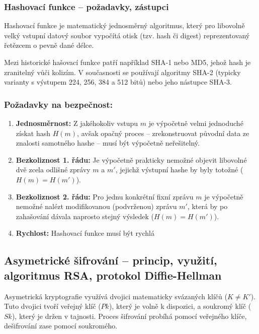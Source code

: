                 \subsubsection{Hashovací funkce – požadavky, zástupci}
                    Hashovací funkce je matematický jednosměrný algoritmus, který pro libovolně velký vstupní datový soubor vypočítá otisk (tzv. hash či digest) reprezentovaný řetězcem o pevně dané délce.

                    Mezi historické hašovací funkce patří například SHA-1 nebo MD5, jehož hash je zranitelný vůči kolizím. V současnosti se používají algoritmy SHA-2 (typicky varianty s výstupem 224, 256, 384 a 512 bitů) nebo jeho nástupce SHA-3.

                    
                    \subsubsection*{Požadavky na bezpečnost:}
                        \begin{enumerate}
                            \item \textbf{Jednosměrnost:} Z jakéhokoliv vstupu $m$ je výpočetně velmi jednoduché získat hash $H(m)$, avšak opačný proces – zrekonstruovat původní data ze znalosti samotného hashe – musí být výpočetně neřešitelný.
                            \item \textbf{Bezkoliznost 1. řádu:} Je výpočetně prakticky nemožné objevit libovolné dvě zcela odlišné zprávy $m$ a $m'$, jejichž výstupní hashe by byly totožné ($H(m) = H(m')$).
                            \item \textbf{Bezkoliznost 2. řádu:} Pro jednu konkrétní fixní zprávu $m$ je výpočetně nemožné nalézt modifikovanou (podvrženou) zprávu $m'$, která by po zahašování dávala naprosto stejný výsledek ($H(m) = H(m')$).
                            \item \textbf{Rychlost:} Hashovací funkce musí být rychlá
                        \end{enumerate}
            \subsection{Asymetrické šifrování – princip, využití, algoritmus RSA, protokol Diffie-Hellman}
                Asymetrická kryptografie využívá dvojici matematicky svázaných klíčů ($K \neq K'$). Tuto dvojici tvoří veřejný klíč ($Pk$), který je volně k dispozici, a soukromý klíč ($Sk$), který je držen v tajnosti. Proces šifrování probíhá pomocí veřejného klíče, dešifrování zase pomocí soukromého.
                

